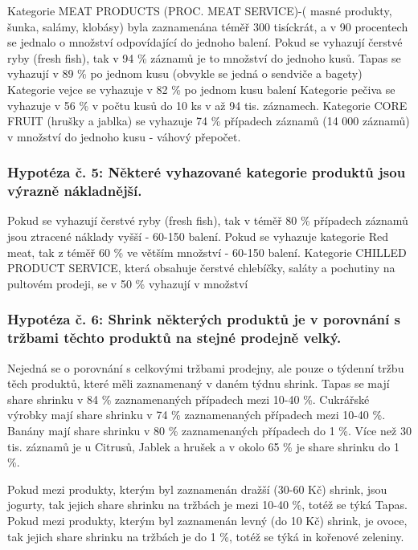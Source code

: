  Kategorie MEAT PRODUCTS (PROC. MEAT SERVICE)-( masné produkty, šunka, salámy, klobásy) byla zaznamenána téměř 300 tisíckrát, a v 90 procentech se jednalo o množství odpovídající do jednoho balení. 
 Pokud se vyhazují čerstvé ryby (fresh fish), tak v 94 
\% záznamů je to množství do jednoho kusů. Tapas se vyhazují v 89 \% po jednom kusu (obvykle se jedná o sendviče a bagety)
Kategorie vejce se vyhazuje v 82 \% po jednom kusu balení
Kategorie pečiva se vyhazuje v 56 \% v počtu kusů do 10 ks v až 94 tis. záznamech.
Kategorie CORE FRUIT (hrušky a jablka) se vyhazuje 74 \% případech záznamů (14 000 záznamů) v množství do jednoho kusu - váhový přepočet.

\subsubsection*{Hypotéza č. 5: Některé vyhazované kategorie produktů jsou výrazně nákladnější.}

Pokud se vyhazují čerstvé ryby (fresh fish), tak v téměř 80 \% případech záznamů jsou ztracené náklady vyšší  - 60-150 balení.
Pokud se vyhazuje kategorie Red meat, tak z téměř 60 \% ve větším množství - 60-150 balení.
Kategorie CHILLED PRODUCT SERVICE, která obsahuje čerstvé chlebíčky, saláty a pochutiny na pultovém prodeji, se v 50 \% vyhazují v množství

\subsubsection*{Hypotéza č. 6: Shrink některých produktů je v porovnání s tržbami těchto produktů na stejné prodejně velký.}

Nejedná se o porovnání s celkovými tržbami prodejny, ale pouze o týdenní tržbu těch produktů, které měli zaznamenaný v daném týdnu shrink.
Tapas se mají share shrinku v 84 \% zaznamenaných případech mezi 10-40 \%.
 Cukrářské výrobky  mají share shrinku v 74 \% zaznamenaných případech mezi 10-40 \%.
 Banány mají share shrinku v 80 \% zaznamenaných případech do 1 \%.
 Více než 30 tis. záznamů je u Citrusů, Jablek a hrušek a v okolo 65 \% je share shrinku do 1 \%.

 Pokud mezi produkty, kterým byl zaznamenán dražší (30-60 Kč) shrink, jsou jogurty, tak jejich share shrinku na tržbách je mezi 10-40 \%, totéž se týká Tapas.
Pokud mezi produkty, kterým byl zaznamenán levný (do 10 Kč) shrink, je ovoce, tak jejich share shrinku na tržbách je do 1 \%, totéž se týká in kořenové zeleniny.


